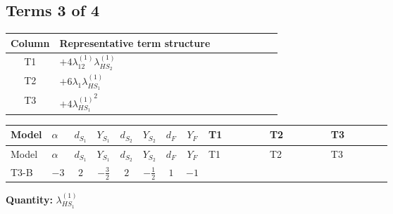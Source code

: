 \documentclass[8pt]{article}
\begin{document}
\begin{landscape}
\subsection*{Terms 3 of 4}
\begin{center}
\begin{tabular}{@{}c >{\raggedright\arraybackslash}p{0.82\linewidth}@{}}
\toprule
Column & Representative term structure \\
\midrule
T1 & \(\displaystyle +4 {\lambda_{12}^{(1)}} {\lambda_{HS_2}^{(1)}}\) \\
\midrule
T2 & \(\displaystyle +6 {\lambda_1} {\lambda_{HS_1}^{(1)}}\) \\
\midrule
T3 & \(\displaystyle +4 {\lambda_{HS_1}^{(1)}}^2\) \\
\midrule
\bottomrule
\end{tabular}
\end{center}
\smallskip
\tiny
\begin{longtable}{@{}llcccccc >{\raggedright\arraybackslash}p{0.21\linewidth} >{\raggedright\arraybackslash}p{0.21\linewidth} >{\raggedright\arraybackslash}p{0.21\linewidth}@{}}
\toprule
Model & $\alpha$ & $d_{S_1}$ & $Y_{S_1}$ & $d_{S_2}$ & $Y_{S_2}$ & $d_F$ & $Y_F$ & T1 & T2 & T3 \\
\midrule
\endfirsthead
\toprule
Model & $\alpha$ & $d_{S_1}$ & $Y_{S_1}$ & $d_{S_2}$ & $Y_{S_2}$ & $d_F$ & $Y_F$ & T1 & T2 & T3 \\
\midrule
\endhead
T3-B & $-3$ & $2$ & $-\frac{3}{2}$ & $2$ & $-\frac{1}{2}$ & $1$ & $-1$ & \scriptsize\adjustbox{max width=\linewidth}{$\begin{gathered} +4 {\lambda_{12}^{(1)}} {\lambda_{HS_2}^{(1)}}\end{gathered}$} & \scriptsize\adjustbox{max width=\linewidth}{$\begin{gathered} +6 {\lambda_1} {\lambda_{HS_1}^{(1)}}\end{gathered}$} & \scriptsize\adjustbox{max width=\linewidth}{$\begin{gathered} +4 {\lambda_{HS_1}^{(1)}}^2\end{gathered}$} \\
\midrule
\bottomrule
\end{longtable}
\clearpage
\noindent\textbf{Quantity: }$\lambda_{HS_1}^{(1)}$\par\smallskip

\end{landscape}
\end{document}
